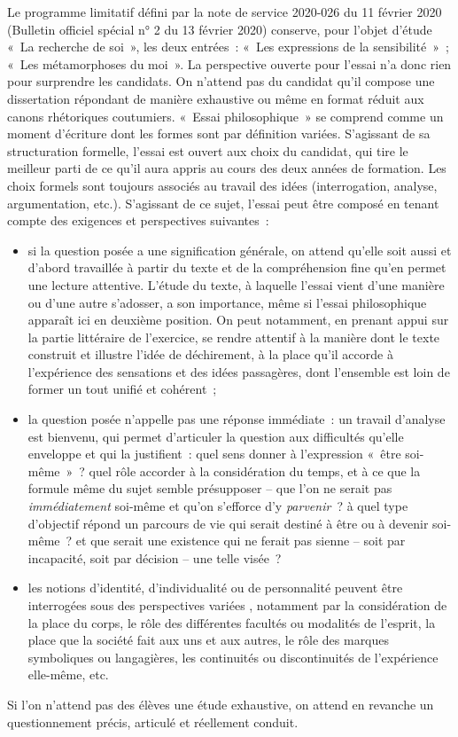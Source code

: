 {Le programme limitatif défini par la note de service 2020-026 du 11 février 2020
(Bulletin officiel spécial n° 2 du 13 février 2020) conserve, pour l'objet d'étude «~La
recherche de soi~», les deux entrées~: «~Les expressions de la sensibilité~»~; «~Les
métamorphoses du moi~». La perspective ouverte pour l'essai n'a donc rien pour
surprendre les candidats.
On n'attend pas du candidat qu'il compose une dissertation répondant de
manière exhaustive ou même en format réduit aux canons rhétoriques coutumiers.
«~Essai philosophique~» se comprend comme un moment d'écriture dont les formes
sont par définition variées. S'agissant de sa structuration formelle, l'essai est ouvert
aux choix du candidat, qui tire le meilleur parti de ce qu'il aura appris au cours des
deux années de formation. Les choix formels sont toujours associés au travail des idées
(interrogation, analyse, argumentation, etc.).
S'agissant de ce sujet, l'essai peut être composé en tenant compte des exigences et
perspectives suivantes~:

\begin{itemize}

\item si la question posée a une signification générale, on attend qu'elle soit aussi et
d'abord travaillée à partir du texte et de la compréhension fine qu'en permet une
lecture attentive. L'étude du texte, à laquelle l'essai vient d'une manière ou d'une autre s'adosser, a son importance, même si l'essai philosophique apparaît ici en
deuxième position. On peut notamment, en prenant appui sur la partie littéraire
de l'exercice, se rendre attentif à la manière dont le texte construit et illustre l'idée
de déchirement, à la place qu'il accorde à l'expérience des sensations et des idées
passagères, dont l'ensemble est loin de former un tout unifié et cohérent~;

\item la question posée n'appelle pas une réponse immédiate~: un travail d'analyse est
bienvenu, qui permet d'articuler la question aux difficultés qu'elle enveloppe
et qui la justifient~: quel sens donner à l'expression «~être soi-même~»~? quel rôle
accorder à la considération du temps, et à ce que la formule même du sujet semble
présupposer – que l'on ne serait pas \textit{immédiatement} soi-même et qu'on s'efforce
d'y \textit{parvenir}~? à quel type d'objectif répond un parcours de vie qui serait destiné à
être ou à devenir soi-même~? et que serait une existence qui ne ferait pas sienne –
soit par incapacité, soit par décision – une telle visée~?

\item les notions d'identité, d'individualité ou de personnalité peuvent être interrogées
sous des perspectives variées , notamment par la considération de la place du
corps, le rôle des différentes facultés ou modalités de l'esprit, la place que la
société fait aux uns et aux autres, le rôle des marques symboliques ou langagières,
les continuités ou discontinuités de l'expérience elle-même, etc.
\end{itemize}

Si l'on n'attend pas des élèves une étude exhaustive, on attend en revanche un
questionnement précis, articulé et réellement conduit.}

